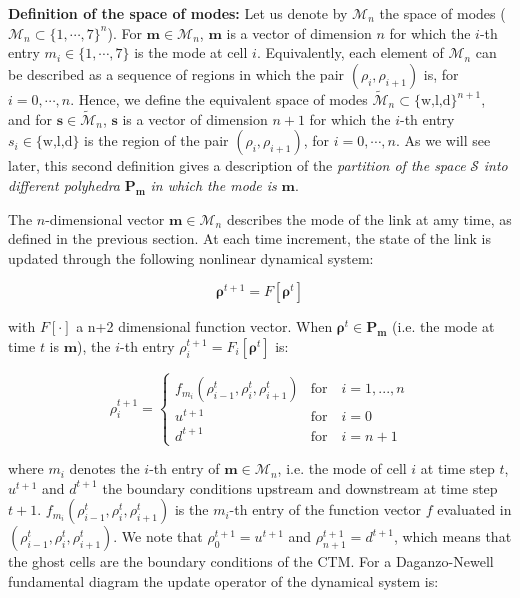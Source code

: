 \noindent\textbf{Definition of the space of modes:} Let us denote by $\mathcal{M}_{n}$ the space of modes ($\mathcal{M}_{n}\subset\{1,\cdots,7\}^{n}$). For $\boldsymbol m \in \mathcal{M}_{n}$, $\boldsymbol m$ is a vector of dimension $n$ for which the $i$-th entry $m_{i}\in\{1,\cdots,7\}$ is the mode at cell $i$. Equivalently, each element of $\mathcal{M}_{n}$ can be described as a sequence of regions in which the pair $(\rho_{i},\rho_{i+1})$ is, for $i=0,\cdots,n$. Hence, we define the equivalent space of modes $\tilde{\mathcal{M}}_{n}\subset\{\text{w,l,d}\}^{n+1}$, and for $\boldsymbol s \in \tilde{\mathcal{M}}_{n}$, $\boldsymbol s$ is a vector of dimension $n+1$ for which the $i$-th entry $s_{i}\in\{\text{w,l,d}\}$ is the region of the pair $(\rho_{i},\rho_{i+1})$, for $i=0,\cdots,n$. As we will see later, this second definition gives a description of the \emph{partition of the space} $\mathcal{S}$ \emph{into different polyhedra} $\textbf{P}_{\boldsymbol m}$ \emph{in which the mode is} $\boldsymbol m$.

\hspace{10mm}

The $n$-dimensional vector $\boldsymbol m\in\mathcal{M}_{n}$ describes the mode of the link at amy time, as defined in the previous section. At each time increment, the state of the link is updated through the following nonlinear dynamical system:

\begin{equation}
\boldsymbol\rho^{t+1} = F[\boldsymbol\rho^{t}]
\label{eq:underlyingSystem1}
\end{equation}

\noindent with $F[\cdot]$ a n+2 dimensional function vector. When $\boldsymbol\rho^{t}\in \boldsymbol P_{\boldsymbol m}$ (i.e. the mode at time $t$ is $\boldsymbol m$), the $i$-th entry $\rho^{t+1}_{i}=F_{i}[\boldsymbol\rho^{t}]$ is:

\begin{equation}
\rho^{t+1}_{i} = \begin{cases}
f_{m_{i}}(\rho^{t}_{i-1},\rho^{t}_{i},\rho^{t}_{i+1}) & \text{for}\quad i=1,...,n\\
u^{t+1} & \text{for}\quad i=0\\
d^{t+1} & \text{for}\quad i=n+1
\end{cases}
\label{eq:underlyingSystem2}
\end{equation}

\noindent where $m_{i}$ denotes the $i$-th entry of $\boldsymbol m \in\mathcal{M}_{n}$, i.e. the mode of cell $i$ at time step $t$, $u^{t+1}$ and $d^{t+1}$ the boundary conditions upstream and downstream at time step $t+1$. $f_{m_{i}}(\rho^{t}_{i-1},\rho^{t}_{i},\rho^{t}_{i+1})$ is the $m_{i}$-th entry of the function vector $f$ evaluated in $(\rho^{t}_{i-1},\rho^{t}_{i},\rho^{t}_{i+1})$. We note that $\rho^{t+1}_{0}=u^{t+1}$ and $\rho^{t+1}_{n+1}=d^{t+1}$, which means that the ghost cells are the boundary conditions of the CTM. For a Daganzo-Newell fundamental diagram the update operator of the dynamical system is:

